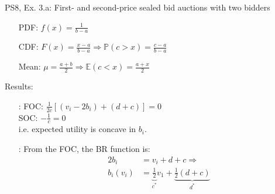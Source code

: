 \begin{frame}{PS8, Ex. 3.a: First- and second-price sealed bid auctions with two bidders}
\begin{multicols}{2}
      \begin{enumerate}
        \item[PDF:] $f(x)=\frac{1}{b-a}$
        \item[CDF:] $F(x)=\frac{x-a}{b-a}\Rightarrow\mathbb{P}(c>x)=\frac{c-a}{b-a}$
        \item[Mean:] $\mu=\frac{a+b}{2}\Rightarrow\mathbb{E}(c<x)=\frac{a+x}{2}$
      \end{enumerate}
      \vspace{-6pt}
      Results:
      \vspace{-6pt}
      \begin{itemize}
        \item[\nth{2}:] FOC: $\frac{1}{2c}[(v_i-2b_i)+(d+c)]=0$\\
                        SOC: $-\frac{1}{c}=0$\\
                        i.e. expected utility is concave in $b_i$.
        \item[\nth{3}:] From the FOC, the BR function is:\vspace{-6pt}
                        \begin{align*}
                          2b_i&=v_i+d+c\Rightarrow\\
                          b_i(v_i)&=\underbrace{\frac{1}{2}}_{c^*}v_1+\underbrace{\frac{1}{2}(d+c)}_{d^*}
                        \end{align*}
      \end{itemize}
      \vfill\null
    \end{multicols}
\end{frame}
